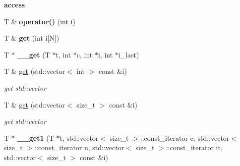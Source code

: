 \begin{Indent}{\bf access}\par
{\em \label{_amgrp9df3b01c60df20d13843841ff0d4482c}
 }\begin{DoxyCompactItemize}
\item 
\hypertarget{class____array_a2640e620004e448f2c9d70e2d048c91e}{
T \& {\bfseries operator()} (int i)}
\label{class____array_a2640e620004e448f2c9d70e2d048c91e}

\item 
\hypertarget{class____array_ab8aa25dbb4bf56dd2df5dca22112deaf}{
T \& {\bfseries get} (int i\mbox{[}N\mbox{]})}
\label{class____array_ab8aa25dbb4bf56dd2df5dca22112deaf}

\item 
\hypertarget{class____array_a048dc1381c0a2e3b8b07d487b6e429b1}{
T $\ast$ {\bfseries \_\-\_\-get} (T $\ast$t, int $\ast$c, int $\ast$i, int $\ast$i\_\-last)}
\label{class____array_a048dc1381c0a2e3b8b07d487b6e429b1}

\item 
\hypertarget{class____array_aaf10d5d8b18d000b9ebd34a396d17260}{
T \& \hyperlink{class____array_aaf10d5d8b18d000b9ebd34a396d17260}{get} (std::vector$<$ int $>$ const \&i)}
\label{class____array_aaf10d5d8b18d000b9ebd34a396d17260}

\begin{DoxyCompactList}\small\item\em get std::vector \item\end{DoxyCompactList}\item 
\hypertarget{class____array_a0eeacc10311382468b2fe0b0e4ce8e81}{
T \& \hyperlink{class____array_a0eeacc10311382468b2fe0b0e4ce8e81}{get} (std::vector$<$ size\_\-t $>$ const \&i)}
\label{class____array_a0eeacc10311382468b2fe0b0e4ce8e81}

\begin{DoxyCompactList}\small\item\em get std::vector \item\end{DoxyCompactList}\item 
\hypertarget{class____array_a559247c4fcb56d589168d13703597b40}{
T $\ast$ {\bfseries \_\-\_\-get1} (T $\ast$t, std::vector$<$ size\_\-t $>$::const\_\-iterator c, std::vector$<$ size\_\-t $>$::const\_\-iterator n, std::vector$<$ size\_\-t $>$::const\_\-iterator it, std::vector$<$ size\_\-t $>$ const \&i)}
\label{class____array_a559247c4fcb56d589168d13703597b40}


\end{DoxyCompactItemize}
\end{Indent}
